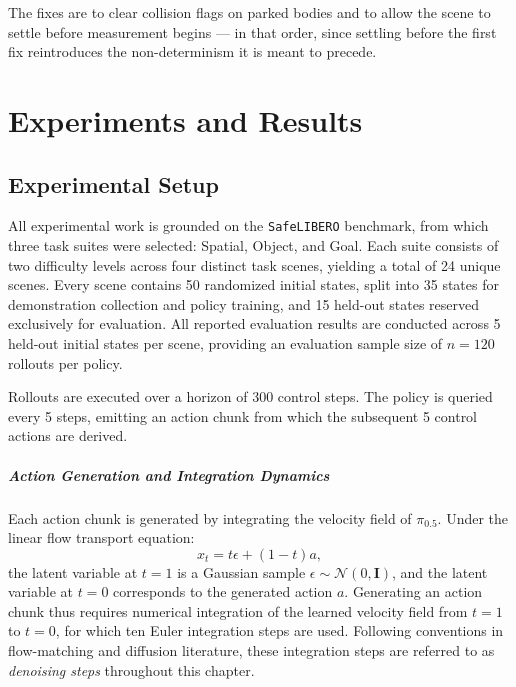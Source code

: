 \documentclass[a4paper,11pt]{report}
\begin{document}
The fixes are to clear collision flags on parked bodies and to allow the scene to settle before
measurement begins --- in that order, since settling before the first fix reintroduces the
non-determinism it is meant to precede.


\chapter{Experiments and Results}\label{ch:results}

\section{Experimental Setup}

All experimental work is grounded on the \texttt{SafeLIBERO} benchmark, from which three task suites were selected: Spatial, Object, and Goal. Each suite consists of two difficulty levels across four distinct task scenes, yielding a total of 24 unique scenes. Every scene contains 50 randomized initial states, split into 35 states for demonstration collection and policy training, and 15 held-out states reserved exclusively for evaluation. All reported evaluation results are conducted across 5 held-out initial states per scene, providing an evaluation sample size of $n = 120$ rollouts per policy.

Rollouts are executed over a horizon of 300 control steps. The policy is queried every 5 steps, emitting an action chunk from which the subsequent 5 control actions are derived.

\paragraph{Action Generation and Integration Dynamics}
Each action chunk is generated by integrating the velocity field of $\pi_{0.5}$. Under the linear flow transport equation:
\begin{equation}
    x_t = t \epsilon + (1 - t) a,
\end{equation}
the latent variable at $t = 1$ is a Gaussian sample $\epsilon \sim \mathcal{N}(0, \mathbf{I})$, and the latent variable at $t = 0$ corresponds to the generated action $a$. Generating an action chunk thus requires numerical integration of the learned velocity field from $t = 1$ to $t = 0$, for which ten Euler integration steps are used. Following conventions in flow-matching and diffusion literature, these integration steps are referred to as \emph{denoising steps} throughout this chapter.
\end{document}
